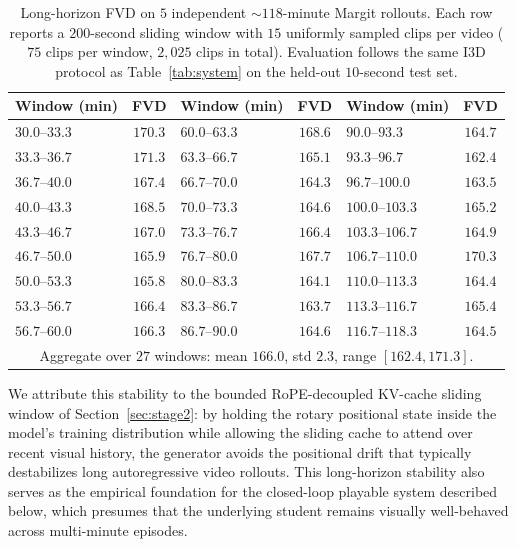 \begin{table}[h]
  \caption{Long-horizon FVD on $5$ independent ${\sim}118$-minute Margit rollouts. Each row reports a $200$-second sliding window with $15$ uniformly sampled clips per video ($75$ clips per window, $2{,}025$ clips in total). Evaluation follows the same I$3$D protocol as Table~\ref{tab:system} on the held-out $10$-second test set.}
  \label{tab:long_horizon}
  \centering\small
  \setlength{\tabcolsep}{6pt}
  \renewcommand{\arraystretch}{0.95}
  \begin{tabular}{lc@{\hskip 1.5em}lc@{\hskip 1.5em}lc}
    \toprule
    Window (min) & FVD & Window (min) & FVD & Window (min) & FVD \\
    \midrule
    $30.0$--$33.3$   & $170.3$ & $60.0$--$63.3$   & $168.6$ & $90.0$--$93.3$    & $164.7$ \\
    $33.3$--$36.7$   & $171.3$ & $63.3$--$66.7$   & $165.1$ & $93.3$--$96.7$    & $162.4$ \\
    $36.7$--$40.0$   & $167.4$ & $66.7$--$70.0$   & $164.3$ & $96.7$--$100.0$   & $163.5$ \\
    $40.0$--$43.3$   & $168.5$ & $70.0$--$73.3$   & $164.6$ & $100.0$--$103.3$  & $165.2$ \\
    $43.3$--$46.7$   & $167.0$ & $73.3$--$76.7$   & $166.4$ & $103.3$--$106.7$  & $164.9$ \\
    $46.7$--$50.0$   & $165.9$ & $76.7$--$80.0$   & $167.7$ & $106.7$--$110.0$  & $170.3$ \\
    $50.0$--$53.3$   & $165.8$ & $80.0$--$83.3$   & $164.1$ & $110.0$--$113.3$  & $164.4$ \\
    $53.3$--$56.7$   & $166.4$ & $83.3$--$86.7$   & $163.7$ & $113.3$--$116.7$  & $165.4$ \\
    $56.7$--$60.0$   & $166.3$ & $86.7$--$90.0$   & $164.6$ & $116.7$--$118.3$  & $164.5$ \\
    \midrule
    \multicolumn{6}{c}{Aggregate over $27$ windows: mean $166.0$, std $2.3$, range $[162.4, 171.3]$.} \\
    \bottomrule
  \end{tabular}
\end{table}

We attribute this stability to the bounded RoPE-decoupled KV-cache sliding window of Section~\ref{sec:stage2}: by holding the rotary positional state inside the model's training distribution while allowing the sliding cache to attend over recent visual history, the generator avoids the positional drift that typically destabilizes long autoregressive video rollouts. This long-horizon stability also serves as the empirical foundation for the closed-loop playable system described below, which presumes that the underlying student remains visually well-behaved across multi-minute episodes.

